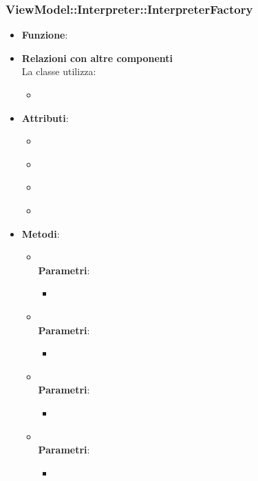 \subsubsection{ViewModel::Interpreter::InterpreterFactory}
\begin{itemize}
\item\textbf{Funzione}:
\item\textbf{Relazioni con altre componenti}\\
La classe utilizza:
	\begin{itemize}
		\item
	\end{itemize}
\item\textbf{Attributi}:
	\begin{itemize}
		\item\code{}\\
		\item\code{}\\
		\item\code{}\\
		\item\code{}\\
	\end{itemize}
\item\textbf{Metodi}:
	\begin{itemize}
		\item\code{}\\
		\textbf{Parametri}:
			\begin{itemize}
				\item\code{}\\
			\end{itemize}
		\item\code{}\\
		\textbf{Parametri}:
			\begin{itemize}
				\item\code{}\\
			\end{itemize}
		\item\code{}\\
		\textbf{Parametri}:
			\begin{itemize}
				\item\code{}\\
			\end{itemize}
		\item\code{}\\
		\textbf{Parametri}:
			\begin{itemize}
				\item\code{}\\
			\end{itemize}
	\end{itemize}
\end{itemize}

